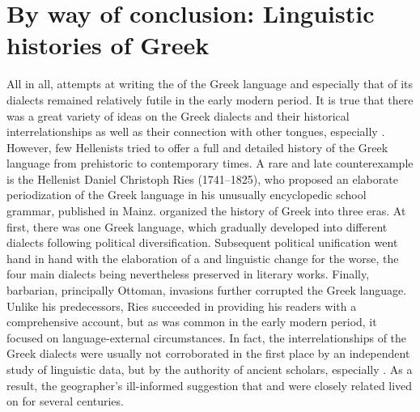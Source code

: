 \section{By way of conclusion: Linguistic histories of Greek}\label{sec:5.8}

All in all, attempts at writing the  of the Greek language and especially that of its dialects remained relatively futile in the early modern period. It is true that there was a great variety of ideas on the Greek dialects and their historical interrelationships as well as their connection with other tongues, especially . However, few Hellenists tried to offer a full and detailed history of the Greek language from prehistoric to contemporary times. A rare and late counterexample is the  Hellenist Daniel Christoph Ries (1741–1825), who proposed an elaborate periodization of the Greek language in his unusually encyclopedic school grammar, published in Mainz. \citet[199--202]{Ries1786} organized the history of Greek into three eras. At first, there was one Greek language, which gradually developed into different dialects following political diversification. Subsequent political unification went hand in hand with the elaboration of a  and linguistic change for the worse, the four main dialects being nevertheless preserved in literary works. Finally, barbarian, principally Ottoman, invasions further corrupted the Greek language. Unlike his predecessors, Ries succeeded in providing his readers with a comprehensive account, but as was common in the early modern period, it focused on language-external circumstances. In fact, the interrelationships of the Greek dialects were usually not corroborated in the first place by an independent study of linguistic data, but by the authority of ancient scholars, especially . As a result, the geographer’s ill-informed suggestion that  and  were closely related lived on for several centuries.


